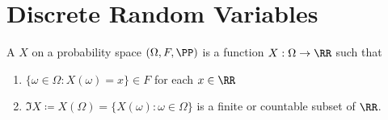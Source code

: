 \chapter{Discrete Random Variables}
A  $X$ on a probability space $(\Omega,F,\PP)$ is a function $X : \Omega \to \RR$ such that
\begin{enumerate}[label=(\alph*)]
\item $\{\omega \in \Omega: X(\omega) = x\} \in F$ for each $x \in \RR$
\item $\Im{X} \coloneqq X(\Omega) = \{X(\omega): \omega \in \Omega\}$ is a finite or countable subset of $\RR$.

\end{enumerate}
